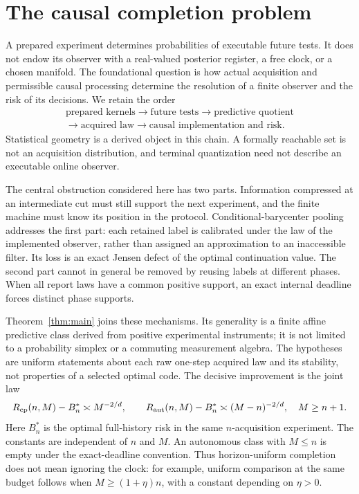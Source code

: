 \section{The causal completion problem}\label{sec:problem}
A prepared experiment determines probabilities of executable future tests. It does not endow its observer with a real-valued posterior register, a free clock, or a chosen manifold. The foundational question is how actual acquisition and permissible causal processing determine the resolution of a finite observer and the risk of its decisions. We retain the order
\[
\begin{gathered}
\text{prepared kernels}\longrightarrow\text{future tests}\longrightarrow
\text{predictive quotient}\\
\longrightarrow\text{acquired law}\longrightarrow
\text{causal implementation and risk}.
\end{gathered}
\]
Statistical geometry is a derived object in this chain. A formally reachable set is not an acquisition distribution, and terminal quantization need not describe an executable online observer.

The central obstruction considered here has two parts. Information compressed at an intermediate cut must still support the next experiment, and the finite machine must know its position in the protocol. Conditional-barycenter pooling addresses the first part: each retained label is calibrated under the law of the implemented observer, rather than assigned an approximation to an inaccessible filter. Its loss is an exact Jensen defect of the optimal continuation value. The second part cannot in general be removed by reusing labels at different phases. When all report laws have a common positive support, an exact internal deadline forces distinct phase supports.

Theorem~\ref{thm:main} joins these mechanisms. Its generality is a finite affine predictive class derived from positive experimental instruments; it is not limited to a probability simplex or a commuting measurement algebra. The hypotheses are uniform statements about each raw one-step acquired law and its stability, not properties of a selected optimal code. The decisive improvement is the joint law
\begin{equation}\label{eq:intro}
 R_{\mathrm{cp}}(n,M)-B_n^*\asymp M^{-2/d},\qquad
 R_{\mathrm{aut}}(n,M)-B_n^*\asymp(M-n)^{-2/d},\quad M\ge n+1.
\end{equation}
Here $B_n^*$ is the optimal full-history risk in the same $n$-acquisition experiment. The constants are independent of $n$ and $M$. An autonomous class with $M\le n$ is empty under the exact-deadline convention. Thus horizon-uniform completion does not mean ignoring the clock: for example, uniform comparison at the same budget follows when $M\ge(1+\eta)n$, with a constant depending on $\eta>0$.

